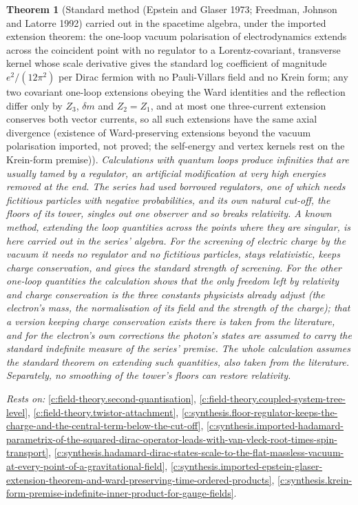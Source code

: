 \documentclass[11pt]{article}
\newtheorem{theorem}{Theorem}[section]
\theoremstyle{definition}
\theoremstyle{plain}
\begin{document}
\begin{theorem}[Standard method (Epstein and Glaser 1973; Freedman, Johnson and Latorre 1992) carried out in the spacetime algebra, under the imported extension theorem: the one-loop vacuum polarisation of electrodynamics extends across the coincident point with no regulator to a Lorentz-covariant, transverse kernel whose scale derivative gives the standard log coefficient of magnitude $e^{2}/(12\pi^{2})$ per Dirac fermion with no Pauli-Villars field and no Krein form; any two covariant one-loop extensions obeying the Ward identities and the reflection differ only by $Z_{3}$, $\delta m$ and $Z_{2} = Z_{1}$, and at most one three-current extension conserves both vector currents, so all such extensions have the same axial divergence (existence of Ward-preserving extensions beyond the vacuum polarisation imported, not proved; the self-energy and vertex kernels rest on the Krein-form premise)]\label{c:synthesis.one-loop-vacuum-polarisation-extends-without-a-regulator-and-ward-preserving-extensions-differ-only-by-the-renormalisation-constants}
Calculations with quantum loops produce infinities that are usually tamed by a regulator, an artificial modification at very high energies removed at the end. The series had used borrowed regulators, one of which needs fictitious particles with negative probabilities, and its own natural cut-off, the floors of its tower, singles out one observer and so breaks relativity. A known method, extending the loop quantities across the points where they are singular, is here carried out in the series' algebra. For the screening of electric charge by the vacuum it needs no regulator and no fictitious particles, stays relativistic, keeps charge conservation, and gives the standard strength of screening. For the other one-loop quantities the calculation shows that the only freedom left by relativity and charge conservation is the three constants physicists already adjust (the electron's mass, the normalisation of its field and the strength of the charge); that a version keeping charge conservation exists there is taken from the literature, and for the electron's own corrections the photon's states are assumed to carry the standard indefinite measure of the series' premise. The whole calculation assumes the standard theorem on extending such quantities, also taken from the literature. Separately, no smoothing of the tower's floors can restore relativity.
\end{theorem}
\noindent\emph{Rests on:} \ref{c:field-theory.second-quantisation}, \ref{c:field-theory.coupled-system-tree-level}, \ref{c:field-theory.twistor-attachment}, \ref{c:synthesis.floor-regulator-keeps-the-charge-and-the-central-term-below-the-cut-off}, \ref{c:synthesis.imported-hadamard-parametrix-of-the-squared-dirac-operator-leads-with-van-vleck-root-times-spin-transport}, \ref{c:synthesis.hadamard-dirac-states-scale-to-the-flat-massless-vacuum-at-every-point-of-a-gravitational-field}, \ref{c:synthesis.imported-epstein-glaser-extension-theorem-and-ward-preserving-time-ordered-products}, \ref{c:synthesis.krein-form-premise-indefinite-inner-product-for-gauge-fields}.
\end{document}
